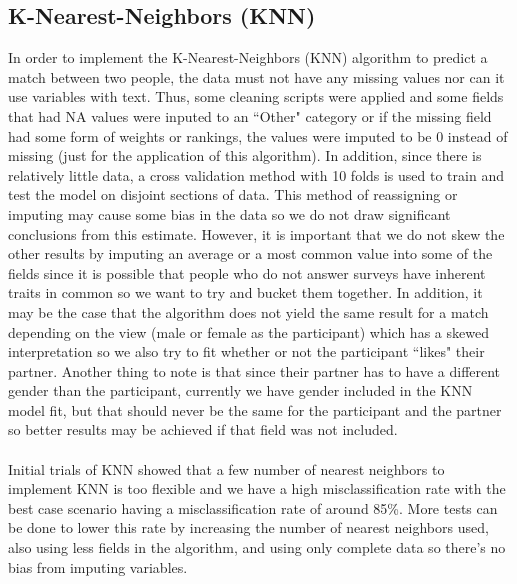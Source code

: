 \documentclass{article}
\begin{document}
\subsection{K-Nearest-Neighbors (KNN)}
\label{sec:KNN}
In order to implement the K-Nearest-Neighbors (KNN) algorithm to predict a match between two people, the data must not have any missing values nor can it use variables with text.  Thus, some cleaning scripts were applied and some fields that had NA values were inputed to an ``Other" category or if the missing field had some form of weights or rankings, the values were imputed to be 0 instead of missing (just for the application of this algorithm).  In addition, since there is relatively little data, a cross validation method with 10 folds is used to train and test the model on disjoint sections of data.  This method of reassigning or imputing may cause some bias in the data so we do not draw significant conclusions from this estimate.  However, it is important that we do not skew the other results by imputing an average or a most common value into some of the fields since it is possible that people who do not answer surveys have inherent traits in common so we want to try and bucket them together.  In addition, it may be the case that the algorithm does not yield the same result for a match depending on the view (male or female as the participant) which has a skewed interpretation so we also try to fit whether or not the participant ``likes" their partner.  Another thing to note is that since their partner has to have a different gender than the participant, currently we have gender included in the KNN model fit, but that should never be the same for the participant and the partner so better results may be achieved if that field was not included.\\
\null\\
Initial trials of KNN showed that a few number of nearest neighbors to implement KNN is too flexible and we have a high misclassification rate with the best case scenario having a misclassification rate of around 85\%.  More tests can be done to lower this rate by increasing the number of nearest neighbors used, also using less fields in the algorithm, and using only complete data so there's no bias from imputing variables.
%
\end{document}
